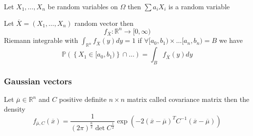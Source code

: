 \documentclass[../main.tex]{subfiles}
\begin{document}
\begin{crly}
Let $X_1, \ldots, X_n$ be random variables on $ \Omega$ then $ \sum a_i X_i$ is a random variable
\end{crly}
\begin{defn}
	Let $ \overline{X}= ( X_1, \ldots, X_n) $ random vector then
	\[ 
	f_{\overline{X}} : \mathbb{R}^n\to [ 0, \infty )
	\]
	Riemann integrable with $ \int_{ \mathbb{R}^n} f_{\overline{X}} ( y) dy= 1 $ 
	if $\forall [ a_0, b_1) \times \ldots [ a_n, b_n) = B $ we have
	\[ 
	\mathbb{P}(  \left\{ X_1 \in[a_0,b_1) \right\} \cap \ldots) = \int_{B} f_{\overline{X}} ( y) dy
	\]
		
\end{defn}
\subsubsection*{Gaussian vectors}

Let $ \overline{\mu} \in \mathbb{R}^n$ and $ C$ positive definite $n \times n $ matrix called covariance matrix then the density
\[ 
f_{\overline{\mu}, C} ( \overline{x}) = \frac{1}{( 2\pi )^{\frac{n}{2}}\det C ^{\frac{1}{2}}} \exp \left( - 2( \overline{x}- \overline{\mu})^{T}C^{-1}( \overline{x}- \overline{\mu}) \right) 
\]
\end{document}
